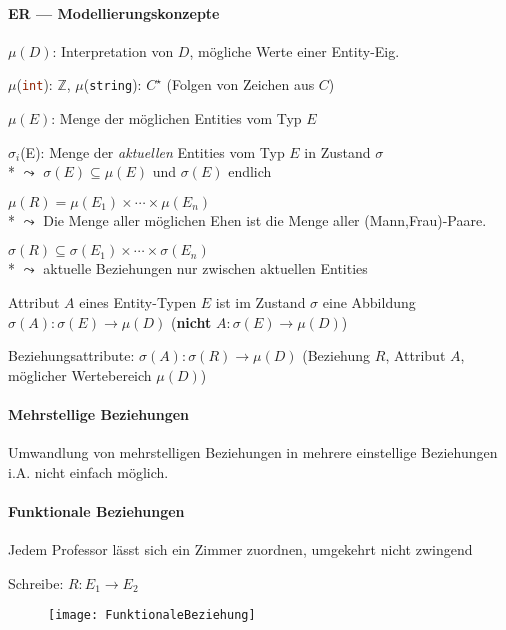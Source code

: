 \paragraph{ER --- Modellierungskonzepte}
\begin{items}
	\item \( \mu(D) \): Interpretation von \( D \), mögliche Werte einer Entity-Eig.
	\item \( \mu \)(\lstinline[language=sql]{int}): \( \mathbb{Z} \),  \( \mu \)(\lstinline[language=sql]{string}): \( C^\star \) (Folgen von Zeichen aus \( C \))
	\item \( \mu(E) \): Menge der möglichen Entities vom Typ \( E \)
	\item \( \sigma_i \)(E): Menge der \emph{aktuellen} Entities vom Typ \( E \) in Zustand \( \sigma\)
	\\* \( \leadsto \) \( \sigma(E) \subseteq \mu(E) \) und \( \sigma(E) \) endlich
	\item \( \mu(R) = \mu(E_1) \times \cdots \times \mu(E_n) \) \\* \( \leadsto \) Die Menge aller möglichen Ehen ist die Menge aller (Mann,Frau)-Paare.
	\item \( \sigma(R) \subseteq \sigma(E_1) \times \cdots \times \sigma(E_n) \) \\* \( \leadsto \) aktuelle Beziehungen nur zwischen aktuellen Entities
	\item Attribut \( A \) eines Entity-Typen \( E \) ist im Zustand \( \sigma \) eine Abbildung \( \sigma(A): \sigma(E) \to \mu(D) \) (\textbf{nicht} \( A: \sigma(E) \to \mu(D) \))
	\item Beziehungsattribute: \( \sigma(A): \sigma(R) \to \mu(D) \) (Beziehung \( R \), Attribut \( A \), möglicher Wertebereich \( \mu(D) \))
\end{items}

\paragraph{Mehrstellige Beziehungen}
\begin{items}
	\item Umwandlung von mehrstelligen Beziehungen in mehrere einstellige Beziehungen i.A. nicht einfach möglich.
\end{items}

\paragraph{Funktionale Beziehungen}
\begin{items}
	\item Jedem Professor lässt sich ein Zimmer zuordnen, umgekehrt nicht zwingend
	\item Schreibe: \( R: E_1 \to E_2 \)
\end{items}
\begin{figure}[H]\centering\label{FunktionaleBeziehung}\texttt{[image: FunktionaleBeziehung]}\end{figure}



